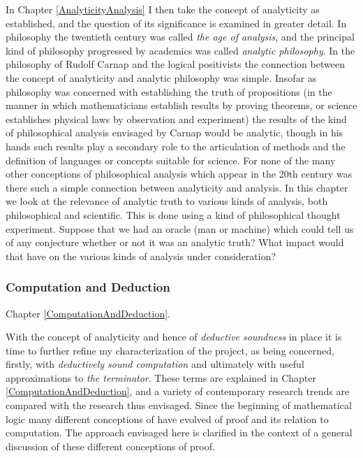 In Chapter \ref{AnalyticityAnalysis} I then take the concept of
analyticity as established, and the question of its significance is
examined in greater detail. 
In philosophy the twentieth century was called {\it the age of
  analysis}, and the principal kind of philosophy progressed by
academics was called {\it analytic philosophy}. 
In the philosophy of Rudolf Carnap and the logical positivists the
connection between the concept of analyticity and analytic philosophy
was simple. 
Insofar as philosophy was concerned with establishing the truth of
propositions (in the manner in which mathematicians establish results
by proving theorems, or science establishes physical laws by
observation and experiment) the results of the kind of philosophical
analysis envisaged by Carnap would be analytic, though in his hands
such results play a secondary role to the articulation of methods and
the definition of languages or concepts suitable for science. 
For none of the many other conceptions of philosophical analysis which
appear in the 20th century was there such a simple connection
between analyticity and analysis. 
In this chapter we look at the relevance of analytic truth to various
kinds of analysis, both philosophical and scientific. 
This is done using a kind of philosophical thought experiment.
Suppose that we had an oracle (man or machine) which could tell us of
any conjecture whether or not it was an analytic truth? 
What impact would that have on the various kinds of analysis under
consideration?

\subsubsection{Computation and Deduction}

Chapter \ref{ComputationAndDeduction}.

With the concept of analyticity and hence of {\it deductive
  soundness} in place it is time to further refine my characterization
of the project, as being concerned, firstly, with {\it deductively
  sound computation} and ultimately with useful approximations to
{\it the terminator}. 
These terms are explained in Chapter
\ref{ComputationAndDeduction}, and a variety of
contemporary research trends are compared with the research thus envisaged.
Since the beginning of mathematical logic many different conceptions of
have evolved of proof and its relation to computation.
The approach envisaged here is clarified in the context of a general
discussion of these different conceptions of proof.

